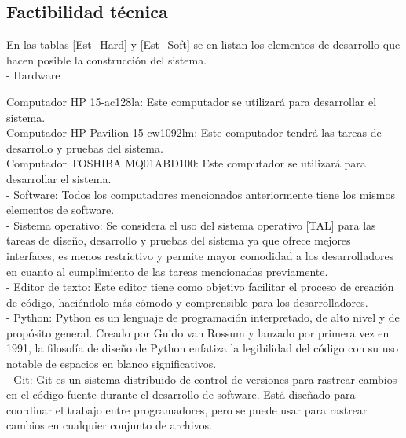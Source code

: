 \subsection{Factibilidad técnica}
\noindent En las tablas \ref{Est_Hard} y \ref{Est_Soft} se en listan los elementos de desarrollo que hacen posible la construcción del sistema.\\

- Hardware


\noindent Computador HP 15-ac128la: Este computador se utilizará para desarrollar el sistema.\\
Computador HP Pavilion 15-cw1092lm: Este computador tendrá las tareas de desarrollo y pruebas del sistema.\\
Computador TOSHIBA MQ01ABD100: Este computador se utilizará para desarrollar el sistema.\\

- Software: Todos los computadores mencionados anteriormente tiene los mismos elementos de software.\\

\noindent - Sistema operativo: Se considera el uso del sistema operativo [TAL] para las tareas de diseño, desarrollo y pruebas del sistema ya que ofrece mejores interfaces, es menos restrictivo y permite mayor comodidad a los desarrolladores en cuanto al cumplimiento de las tareas mencionadas previamente.\\

\noindent - Editor de texto: Este editor tiene como objetivo facilitar el proceso de creación de código, haciéndolo más cómodo y comprensible para los desarrolladores.\\

\noindent - Python: Python es un lenguaje de programación interpretado, de alto nivel y de propósito general. Creado por Guido van Rossum y lanzado por primera vez en 1991, la filosofía de diseño de Python enfatiza la legibilidad del código con su uso notable de espacios en blanco significativos.\\

\noindent - Git: Git es un sistema distribuido de control de versiones para rastrear cambios en el código fuente durante el desarrollo de software. Está diseñado para coordinar el trabajo entre programadores, pero se puede usar para rastrear cambios en cualquier conjunto de archivos.\\

